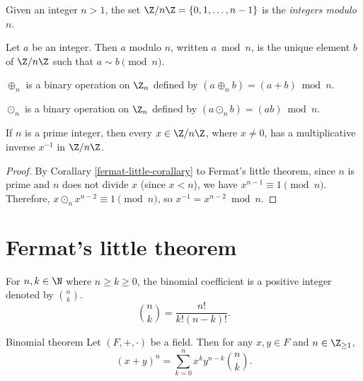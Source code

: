 \documentclass[12pt]{article}
\begin{document}
\begin{defn}\label{mod-n}
    Given an integer $n > 1$, the set $\Z/n\Z = \{0, 1, \ldots, n-1\}$ is the \emph{integers modulo $n$}.
\end{defn}

\begin{defn}\label{modulo}
    Let $a$ be an integer. Then $a$ modulo $n$, written $a \bmod n$, is the unique element $b$ of $\Z/n\Z$ such that $a \sim b \pmod n$.
\end{defn}

\begin{defn}
    $\oplus_n$ is a binary operation on $\Z_n$ defined by $(a \oplus_n b) = (a + b)\bmod n$.
\end{defn}

\begin{defn}
    $\odot_n$ is a binary operation on $\Z_n$ defined by $(a \odot_n b) = (ab)\bmod n$.
\end{defn}

\begin{thm}\label{znz-prime-field}
    If $n$ is a prime integer, then every $x \in \Z/n\Z$, where $x \neq 0$, has a multiplicative inverse $x^{-1}$ in $\Z/n\Z$.
\end{thm}

\begin{proof}
    By Corallary \ref{fermat-little-corallary} to Fermat's little theorem, since $n$ is prime and $n$ does not divide $x$ (since $x < n$), we have $x^{n-1} \equiv 1 \pmod n$. Therefore, $x \odot_n x^{n-2} \equiv 1 \pmod n$, so $x^{-1} = x^{n-2} \bmod n$.
\end{proof}

\section{Fermat's little theorem}

\begin{defn}
    For $n, k \in \N$ where $n \geq k \geq 0$, the binomial coefficient is a positive integer denoted by $n \choose k$. \[{n \choose k} = \frac{n!}{k!(n-k)!}.\]
\end{defn}

\begin{thm}{Binomial theorem}\label{binomial-theorem}\proofbreak
    Let $(F, +, \cdot)$ be a field. Then for any $x, y \in F$ and $n \in \Z_{\geq 1}$, \[\left(x + y\right)^n = \sum_{k=0}^n x^ky^{n-k}{n \choose k}.\]
\end{thm}
\end{document}

